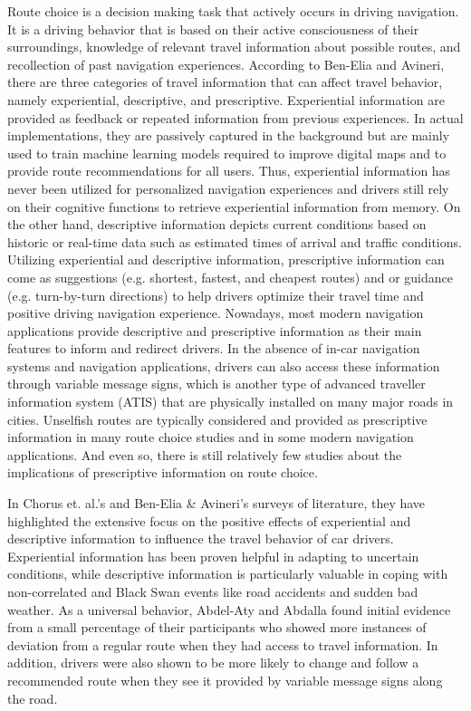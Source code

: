 Route choice is a decision making task that actively occurs in driving navigation\cite{donges1999conceptual}. It is a driving behavior that is based on their active consciousness of their surroundings, knowledge of relevant travel information about possible routes, and recollection of past navigation experiences. According to Ben-Elia and Avineri, there are three categories of travel information that can affect travel behavior, namely experiential, descriptive, and prescriptive\cite{Ben-Elia2015ResponseReview}. Experiential information are provided as feedback or repeated information from previous experiences. In actual implementations, they are passively captured in the background but are mainly used to train machine learning models required to improve digital maps and to provide route recommendations for all users. Thus, experiential information has never been utilized for personalized navigation experiences and drivers still rely on their cognitive functions to retrieve experiential information from memory. On the other hand, descriptive information depicts current conditions based on historic or real-time data such as estimated times of arrival and traffic conditions. Utilizing experiential and descriptive information, prescriptive information can come as suggestions (e.g. shortest, fastest, and cheapest routes) and or guidance (e.g. turn-by-turn directions) to help drivers optimize their travel time and positive driving navigation experience. Nowadays, most modern navigation applications provide descriptive and prescriptive information as their main features to inform and redirect drivers\cite{Sha2013SocialNavigation}. In the absence of in-car navigation systems and navigation applications, drivers can also access these information through variable message signs, which is another type of advanced traveller information system (ATIS) that are physically installed on many major roads in cities. Unselfish routes are typically considered and provided as prescriptive information in many route choice studies and in some modern navigation applications. And even so, there is still relatively few studies about the implications of prescriptive information on route choice. 

In Chorus et. al.'s \cite{Chorus2006TravelReview} and Ben-Elia \& Avineri's \cite{Ben-Elia2015ResponseReview} surveys of literature, they have highlighted the extensive focus on the positive effects of experiential and descriptive information to influence the travel behavior of car drivers. Experiential information has been proven helpful in adapting to uncertain conditions, while descriptive information is particularly valuable in coping with non-correlated and Black Swan events like road accidents and sudden bad weather. As a universal behavior, Abdel-Aty and Abdalla found initial evidence from a small percentage of their participants who showed more instances of deviation from a regular route when they had access to travel information\cite{abdel2004modeling}. In addition, drivers were also shown to be more likely to change and follow a recommended route when they see it provided by variable message signs along the road\cite{peeta2006driver,erke2007effects}. 

